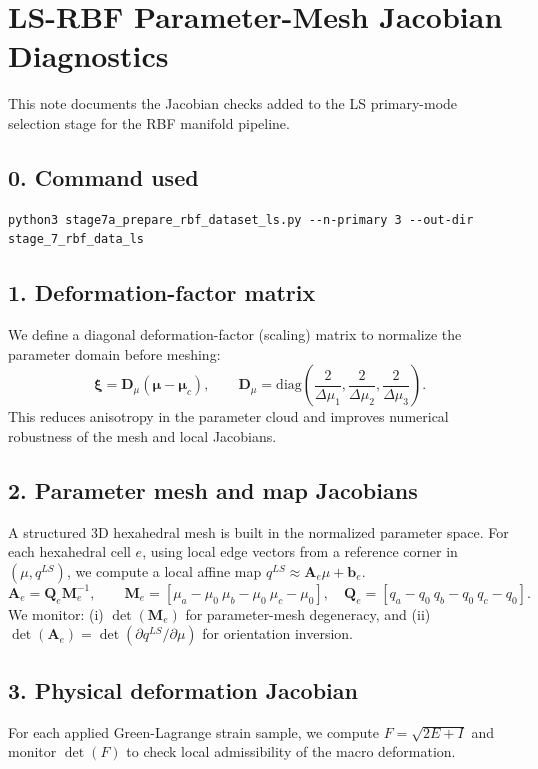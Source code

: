 \documentclass[11pt]{article}
\begin{document}
\section*{LS-RBF Parameter-Mesh Jacobian Diagnostics}
This note documents the Jacobian checks added to the LS primary-mode selection stage for the RBF manifold pipeline.
\subsection*{0. Command used}
\begin{verbatim}
python3 stage7a_prepare_rbf_dataset_ls.py --n-primary 3 --out-dir stage_7_rbf_data_ls
\end{verbatim}
\subsection*{1. Deformation-factor matrix}
We define a diagonal deformation-factor (scaling) matrix to normalize the parameter domain before meshing:
\begin{equation}
\boldsymbol{\xi} = \mathbf{D}_{\mu}(\boldsymbol{\mu}-\boldsymbol{\mu}_c),\qquad \mathbf{D}_{\mu} = \mathrm{diag}\!\left(\frac{2}{\Delta \mu_1},\frac{2}{\Delta \mu_2},\frac{2}{\Delta \mu_3}\right).
\end{equation}
This reduces anisotropy in the parameter cloud and improves numerical robustness of the mesh and local Jacobians.
\subsection*{2. Parameter mesh and map Jacobians}
A structured 3D hexahedral mesh is built in the normalized parameter space. For each hexahedral cell $e$, using local edge vectors from a reference corner in $(\mu,q^{LS})$, we compute a local affine map $q^{LS}\approx \mathbf{A}_e\mu+\mathbf{b}_e$.
\begin{equation}
\mathbf{A}_e = \mathbf{Q}_e\mathbf{M}_e^{-1},\qquad \mathbf{M}_e=[\mu_a-\mu_0\ \mu_b-\mu_0\ \mu_c-\mu_0],\quad \mathbf{Q}_e=[q_a-q_0\ q_b-q_0\ q_c-q_0].
\end{equation}
We monitor: (i) $\det(\mathbf{M}_e)$ for parameter-mesh degeneracy, and (ii) $\det(\mathbf{A}_e)=\det(\partial q^{LS}/\partial\mu)$ for orientation inversion.
\subsection*{3. Physical deformation Jacobian}
For each applied Green-Lagrange strain sample, we compute $F=\sqrt{2E+I}$ and monitor $\det(F)$ to check local admissibility of the macro deformation.
\end{document}
